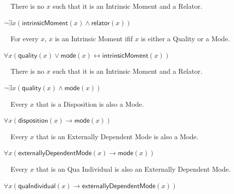 \documentclass{article}
\newcommand{\AxLabel}{a}
\newcounter{cntax}
\newcommand{\myax}[1]{\refstepcounter{cntax}{\bf \small \AxLabel\thecntax}\label{#1}$\,\,\,\,$}
\newcommand{\me}[1]{\textsf{#1}}
\begin{document}
\begin{itemize}
    \item[\myax{ax_moment_partition}] There is no $x$ such that it is an \me{Intrinsic Moment} and a \me{Relator}.
    
    $\neg \exists x(\textsf{intrinsicMoment}(x)\wedge \textsf{relator}(x))$
    
    

    \item[\myax{ax_intrinsicMoment_taxonomy}] For every $x$, $x$ is an \me{Intrinsic Moment} ifif $x$ is either a \me{Quality} or a \me{Mode}.
    
    $\forall x(\textsf{quality}(x)\vee \textsf{mode}(x)\leftrightarrow \textsf{intrinsicMoment}(x))$
    
    
    
    
    \item[\myax{ax_intrinsicMoment_partition}] There is no $x$ such that it is an \me{Intrinsic Moment} and a \me{Relator}.
    
    $\neg \exists x(\textsf{quality}(x)\wedge \textsf{mode}(x))$
    
    

    \item[\myax{ax_mode_taxonomy_disposition}] Every $x$ that is a \me{Disposition} is also a \me{Mode}.
    
    $\forall x(\textsf{disposition}(x)\rightarrow \textsf{mode}(x))$
    
    

    \item[\myax{ax_mode_taxonomy_externallyDependentMode}] Every $x$ that is an \me{Externally Dependent Mode} is also a \me{Mode}.
    
    $\forall x(\textsf{externallyDependentMode}(x)\rightarrow \textsf{mode}(x))$
    
    

    \item[\myax{ax_externallyDependentMode_taxonomy_quaIndividual}] Every $x$ that is an \me{Qua Individual} is also an \me{Externally Dependent Mode}.
    
    $\forall x(\textsf{quaIndividual}(x)\rightarrow \textsf{externallyDependentMode}(x))$
    
    
\end{itemize}
\end{document}
